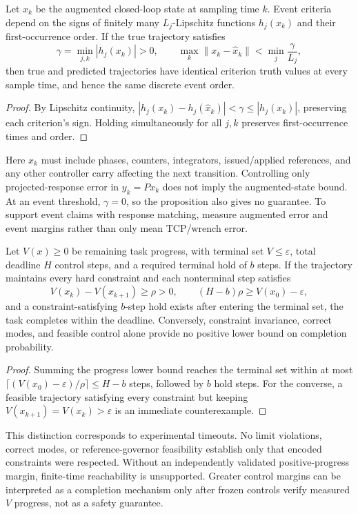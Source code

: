 \begin{proposition}
Let $x_k$ be the augmented closed-loop state at sampling time $k$. Event criteria depend on the signs of finitely many
$L_j$-Lipschitz functions $h_j(x_k)$ and their first-occurrence order. If the true trajectory satisfies
\[
 \gamma=\min_{j,k}|h_j(x_k)|>0,
 \qquad \max_k\|x_k-\widehat x_k\|<
 \min_j\frac{\gamma}{L_j},
\]
then true and predicted trajectories have identical criterion truth values at every sample time, and hence the same discrete
event order.
\end{proposition}
\begin{proof}
By Lipschitz continuity,
$|h_j(x_k)-h_j(\widehat x_k)|<\gamma\le |h_j(x_k)|$, preserving each criterion's
sign. Holding simultaneously for all $j,k$ preserves first-occurrence times and order.
\end{proof}
Here $x_k$ must include phases, counters, integrators, issued/applied references,
and any other controller carry affecting the next transition. Controlling only projected-response
error in $y_k=P x_k$ does not imply the augmented-state bound. At an event threshold,
$\gamma=0$, so the proposition also gives no guarantee. To support event claims with response matching,
measure augmented error and event margins rather than only mean TCP/wrench error.

\begin{proposition}
Let $V(x)\ge0$ be remaining task progress, with terminal set $V\le\varepsilon$, total deadline
$H$ control steps, and a required terminal hold of $b$ steps. If the trajectory maintains every hard constraint and each nonterminal
step satisfies
\[
 V(x_k)-V(x_{k+1})\ge\rho>0,
 \qquad (H-b)\rho\ge V(x_0)-\varepsilon,
\]
and a constraint-satisfying $b$-step hold exists after entering the terminal set, the task completes within the deadline.
Conversely, constraint invariance, correct modes, and feasible control alone provide no positive lower bound on completion probability.
\end{proposition}
\begin{proof}
Summing the progress lower bound reaches the terminal set within at most
$\lceil(V(x_0)-\varepsilon)/\rho\rceil\le H-b$ steps, followed by
$b$ hold steps. For the converse, a feasible trajectory satisfying every constraint but keeping $V(x_{k+1})=V(x_k)>\varepsilon$
is an immediate counterexample.
\end{proof}
This distinction corresponds to experimental timeouts. No limit violations, correct modes, or reference-governor
feasibility establish only that encoded constraints were respected. Without an independently validated positive-progress margin,
finite-time reachability is unsupported. Greater control margins can be interpreted as a completion mechanism only after
frozen controls verify measured $V$ progress, not as a safety guarantee.

